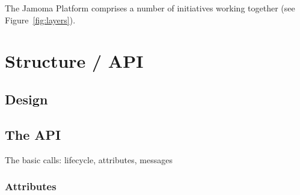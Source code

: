 \documentclass[twoside,10pt]{article}
\newenvironment{packed_item}{
\begin{itemize}
  \setlength{\itemsep}{1pt}
  \setlength{\parskip}{0pt}
  \setlength{\parsep}{0pt}
}{\end{itemize}}
\begin{document}
The Jamoma Platform comprises a number of initiatives working together
(see Figure~\ref{fig:layers}).





\section{Structure / API} %

\subsection{Design}



\subsection{The API}

The basic calls: lifecycle, attributes, messages

\subsubsection{Attributes}
\end{document}
